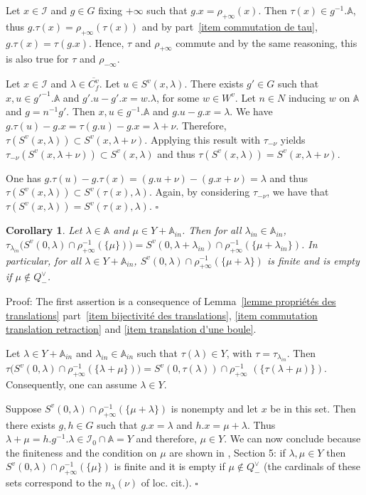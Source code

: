 \documentclass[12pt]{article}
\theoremstyle{plain}
\newtheorem{cor}[thm]{Corollary}
\theoremstyle{definition}
\newcommand{\A}{\mathbb{A}}
\newcommand{\I}{\mathcal{I}}
\begin{document}
Let $x\in \I$ and $g\in G$ fixing $+\infty$ such that $g.x=\rho_{+\infty}(x)$. 
Then $\tau(x)\in g^{-1}.\A$, thus $g.\tau(x)=\rho_{+\infty}(\tau(x))$ and by
 part~\ref{item commutation de tau}, $g.\tau(x)=\tau(g.x)$. Hence, $\tau$ and
  $\rho_{+\infty}$ commute and by the same reasoning, this is also true for $\tau$ and $\rho_{-\infty}$.

Let $x\in\I$ and $\lambda\in \overline{C_f^v}$. Let $u\in S^v(x,\lambda)$. There exists $g'\in G$ such that $x,u\in g'^{-1}.\A$ and $g'.u-g'.x=w.\lambda$, for some $w\in W^v$. Let $n\in N$ inducing $w$ on $\A$ and $g=n^{-1}g'$. Then $x,u\in g^{-1}.\A$ and $g.u-g.x=\lambda$. We have $g.\tau(u)-g.x=\tau(g.u)-g.x=\lambda+\nu$. Therefore, $\tau(S^v(x,\lambda))\subset S^v(x,\lambda+\nu)$. Applying this result with $\tau_{-\nu}$ yields $\tau_{-\nu}(S^v(x,\lambda+\nu))\subset S^v(x,\lambda)$ and thus $\tau(S^v(x,\lambda))=S^v(x,\lambda+\nu)$.

One has $g.\tau(u)-g.\tau(x)=(g.u+\nu)-(g.x+\nu)=\lambda$ and thus $\tau(S^v(x,\lambda))\subset S^v(\tau(x),\lambda)$. Again, by considering $\tau_{-\nu}$, we have that $\tau(S^v(x,\lambda))=S^v(\tau(x),\lambda)$. $\square$


 
 
\begin{cor}\label{cor finitude des boules}
Let $\lambda\in \A$ and $\mu\in Y+\A_{in}$. Then for all $\lambda_{in}\in \A_{in}$, $\tau_{\lambda_{in}}\big(S^v(0,\lambda)\cap \rho_{+\infty}^{-1}(\{\mu\})\big)=S^v(0,\lambda+\lambda_{in})\cap \rho_{+\infty}^{-1}(\{\mu+\lambda_{in}\})$. In particular, for all $\lambda\in Y+\A_{in}$, $S^v(0,\lambda)\cap \rho_{+\infty}^{-1}(\{\mu+\lambda\})$ is finite and is empty if $\mu\notin Q^\vee_-$.

\end{cor}

Proof: The first assertion is a consequence of Lemma~\ref{lemme propriétés des translations} part~\ref{item bijectivité des translations}, \ref{item commutation translation retraction} and \ref{item translation d'une boule}.

Let $\lambda\in Y+\A_{in}$ and $\lambda_{in}\in \A_{in}$ such that $\tau(\lambda)\in Y$, 
with $\tau=\tau_{\lambda_{in}}$. Then 
$\tau\big(S^v(0,\lambda)\cap\rho_{+\infty}^{-1}(\{\lambda+\mu\})\big)=S^v(0,\tau(\lambda))\cap\rho_{+\infty}^{-1}$ $(\{\tau(\lambda+\mu )\})$. Consequently, one can assume $\lambda\in Y$. 

Suppose $S^v(0,\lambda)\cap \rho_{+\infty}^{-1}(\{\mu+\lambda\})$ is nonempty and let $x$ be in this set. Then there exists $g,h\in G$ such that $g.x=\lambda$ and $h.x=\mu+\lambda$. Thus $\lambda+\mu=h.g^{-1}.\lambda\in \I_0\cap \A=Y$ and therefore, $\mu\in Y$. We can now conclude because the finiteness and the condition on  $\mu$ are shown in \cite{gaussent2014spherical}, Section 5: if $\lambda, \mu\in Y$ then $S^v(0,\lambda)\cap \rho_{+\infty}^{-1}(\{\mu\})$ is finite and it is empty if $\mu\notin Q^\vee_-$ (the cardinals of these sets correspond to the $n_\lambda(\nu)$ of loc. cit.).
$\square$
\end{document}
